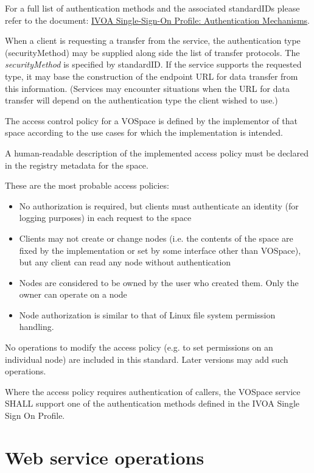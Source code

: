 \documentclass[11pt,a4paper]{ivoa}
\begin{document}
For a full list of authentication methods and the associated standardIDs please refer to the document: \href{http://www.ivoa.net/documents/latest/SSOAuthMech.html}{IVOA Single-Sign-On Profile: Authentication Mechanisms}. 	

When a client is requesting a transfer from the service, the authentication type (securityMethod) may be supplied along side the list of transfer protocols. The \emph{securityMethod} is specified by standardID.  If the service supports the requested type, it may base the construction of the endpoint URL for data transfer from this information.  (Services may encounter situations when the URL for data transfer will depend on the authentication type the client wished to use.)

The access control policy for a VOSpace is defined by the implementor of that space according to the use cases for which the implementation is intended.

A human-readable description of the implemented access policy must be declared in the registry metadata for the space.

These are the most probable access policies:

\begin{itemize}
    \item No authorization is required, but clients must authenticate an identity (for logging purposes) in each request to the space
    \item Clients may not create or change nodes (i.e. the contents of the space are fixed by the implementation or set by some interface other than VOSpace), but any client can read any node without authentication
    \item Nodes are considered to be owned by the user who created them. Only the owner can operate on a node
    \item Node authorization is similar to that of Linux file system permission handling.
\end{itemize}

No operations to modify the access policy (e.g. to set permissions on an individual node) are included in this standard. Later versions may add such operations.

Where the access policy requires authentication of callers, the VOSpace service SHALL support one of the authentication methods defined in the IVOA Single Sign On Profile.

\section{Web service operations}
\label{sec:web service operations}
\end{document}

